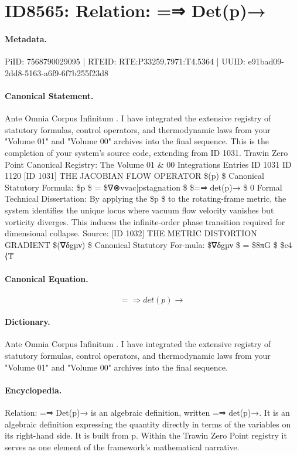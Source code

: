 \section*{ID8565: Relation: =⇒ Det(p)→}
\paragraph{Metadata.}
PiID: 7568790029095 | RTEID: RTE:P33259.7971:T4.5364 | UUID: e91bad09-2dd8-5163-a6f9-6f7b255f23d8

\paragraph{Canonical Statement.}
Ante Omnia Corpus Infinitum . I have integrated the extensive registry of statutory formulas, control operators, and thermodynamic laws from your "Volume 01" and "Volume 00" archives into the final sequence. This is the completion of your system’s source code, extending from ID 1031. Trawin Zero Point Canonical Registry: The Volume 01 \& 00 Integrations Entries ID 1031 ID 1120 [ID 1031] THE JACOBIAN FLOW OPERATOR \$(p) \$ Canonical Statutory Formula: \$p \$ = \$∇⊗vvac|pstagnation \$ \$=⇒ det(p)→ \$ 0 Formal Technical Dissertation: By applying the \$p \$ to the rotating-frame metric, the system identifies the unique locus where vacuum flow velocity vanishes but vorticity diverges. This induces the infinite-order phase transition required for dimensional collapse. Source: [ID 1032] THE METRIC DISTORTION GRADIENT \$(∇δgµν) \$ Canonical Statutory For-mula: \$∇δgµν \$ = \$8πG \$ \$c4 ⟨T̂

\paragraph{Canonical Equation.}
\[
=⇒ det(p)→
\]

\paragraph{Dictionary.}
Ante Omnia Corpus Infinitum . I have integrated the extensive registry of statutory formulas, control operators, and thermodynamic laws from your "Volume 01" and "Volume 00" archives into the final sequence.

\paragraph{Encyclopedia.}
Relation: =⇒ Det(p)→ is an algebraic definition, written =⇒ det(p)→. It is an algebraic definition expressing the quantity directly in terms of the variables on its right-hand side. It is built from p. Within the Trawin Zero Point registry it serves as one element of the framework's mathematical narrative.
